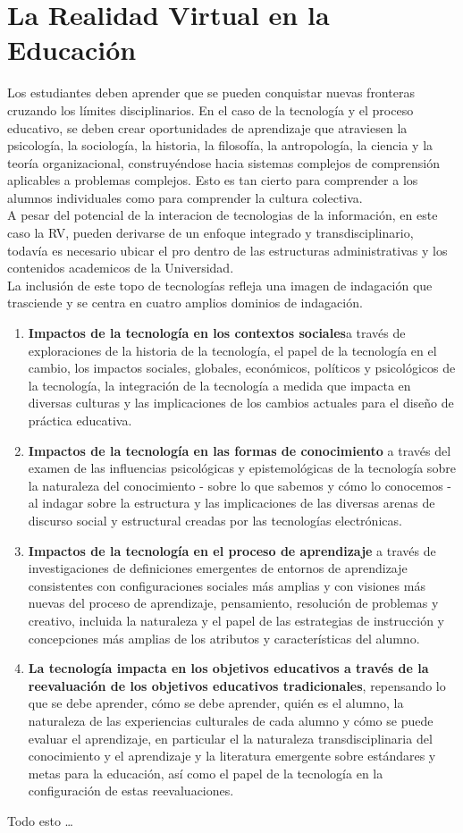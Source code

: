 \section{La Realidad Virtual en la Educaci\'on}
Los estudiantes deben aprender que se pueden conquistar nuevas fronteras cruzando los límites disciplinarios. En el caso de la tecnología y el proceso educativo, 
se deben crear oportunidades de aprendizaje que atraviesen la psicología, la sociología, la historia, la filosofía, la antropología, la ciencia y la teoría organizacional, 
construyéndose hacia sistemas complejos de comprensión aplicables a problemas complejos. Esto es tan cierto para comprender a los alumnos individuales como para comprender 
la cultura colectiva.\\
A pesar del potencial de la interacion de tecnologias de la información, en este caso la RV, pueden derivarse de un enfoque integrado y transdisciplinario, 
todavía es necesario ubicar el pro dentro de las estructuras administrativas y los contenidos academicos de la Universidad.\\ 
La inclusión de este topo de tecnologías refleja una imagen de indagación que trasciende y se centra en cuatro amplios dominios de indagación.\cite{norton1994integrating}
\begin{enumerate}
	\item \textbf{Impactos de la tecnología en los contextos sociales}a través de exploraciones de la historia de la tecnología, el papel de la tecnología en el cambio, los impactos sociales, globales, económicos, políticos y psicológicos de la tecnología, la integración de la tecnología a medida que impacta en diversas culturas y las implicaciones de los cambios actuales para el diseño de práctica educativa.
	\item \textbf{Impactos de la tecnología en las formas de conocimiento} a través del examen de las influencias psicológicas y epistemológicas de la tecnología sobre la naturaleza del conocimiento - sobre lo que sabemos y cómo lo conocemos - al indagar sobre la estructura y las implicaciones de las diversas arenas de discurso social y estructural creadas por las tecnologías electrónicas.
	\item \textbf{Impactos de la tecnología en el proceso de aprendizaje} a través de investigaciones de definiciones emergentes de entornos de aprendizaje consistentes con configuraciones sociales más amplias y con visiones más nuevas del proceso de aprendizaje, pensamiento, resolución de problemas y creativo, incluida la naturaleza y el papel de las estrategias de instrucción y concepciones más amplias de los atributos y características del alumno.
	\item \textbf{La tecnología impacta en los objetivos educativos a través de la reevaluación de los objetivos educativos tradicionales}, repensando lo que se debe aprender, cómo se debe aprender, quién es el alumno, la naturaleza de las experiencias culturales de cada alumno y cómo se puede evaluar el aprendizaje, en particular el la naturaleza transdisciplinaria del conocimiento y el aprendizaje y la literatura emergente sobre estándares y metas para la educación, así como el papel de la tecnología en la configuración de estas reevaluaciones.
\end{enumerate}
Todo esto \dots %
